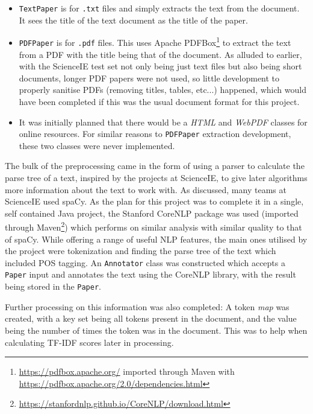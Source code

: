 \begin{itemize}
	\item \texttt{TextPaper} is for \texttt{.txt} files and simply extracts the text from the document. It sees the title of the text document as the title of the paper.
	\item \texttt{PDFPaper} is for \texttt{.pdf} files. This uses Apache PDFBox\footnote{\href{https://pdfbox.apache.org/}{https://pdfbox.apache.org/} imported through Maven with \href{https://pdfbox.apache.org/2.0/dependencies.html}{https://pdfbox.apache.org/2.0/dependencies.html}} to extract the text from a PDF with the title being that of the document. As alluded to earlier, with the ScienceIE test set not only being just text files but also being short documents, longer PDF papers were not used, so little development to properly sanitise PDFs (removing titles, tables, etc...) happened, which would have been completed if this was the usual document format for this project.
	\item It was initially planned that there would be a \textit{HTML} and \textit{WebPDF} classes for online resources. For similar reasons to \texttt{PDFPaper} extraction development, these two classes were never implemented. 
\end{itemize}

The bulk of the preprocessing came in the form of using a parser to calculate the parse tree of a text, inspired by the projects at ScienceIE, to give later algorithms more information about the text to work with. As discussed, many teams at ScienceIE used spaCy. As the plan for this project was to complete it in a single, self contained Java project, the Stanford CoreNLP package was used \cite{Manning2014} (imported through Maven\footnote{\href{https://stanfordnlp.github.io/CoreNLP/download.html}{https://stanfordnlp.github.io/CoreNLP/download.html}}) which performs on similar analysis with similar quality to that of spaCy. While offering a range of useful NLP features, the main ones utilised by the project were tokenization and finding the parse tree of the text which included POS tagging. An \texttt{Annotator} class was constructed which accepts a \texttt{Paper} input and annotates the text using the CoreNLP library, with the result being stored in the \texttt{Paper}.

Further processing on this information was also completed: A token \textit{map} was created, with a key set being all tokens present in the document, and the value being the number of times the token was in the document. This was to help when calculating TF-IDF scores later in processing.

